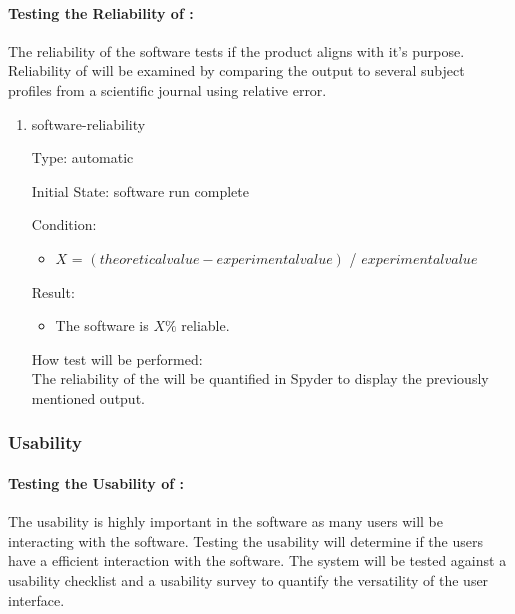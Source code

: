 \documentclass[12pt, titlepage]{article}
\begin{document}
\paragraph{Testing the Reliability of \progname{}:}
The reliability of the software tests if the product aligns with it's purpose. 
Reliability of \progname{} will be examined by comparing the output to several 
subject profiles from a scientific journal using relative error.
\begin{enumerate}

\item{software-reliability\\}

Type: automatic
					
Initial State: \progname{} software run complete
					
Condition:
\begin{itemize} %
\item $X$ = $(theoretical value - experimental value)$ / $experimental value$
\end{itemize}

Result: 
\begin{itemize}
\item The software is $X\%$ reliable.
\end{itemize}
				
					
How test will be performed: \\
The reliability of the \progname{} will be quantified in Spyder to display the 
previously mentioned output. \\

\end{enumerate}

\subsubsection{Usability}

\paragraph{Testing the Usability of \progname{}:}

The usability is highly important in the \progname{} software as many users 
will be interacting with the software. Testing the usability will determine if 
the users have a efficient interaction with the software. The system will be 
tested against a usability checklist and a usability survey to quantify the 
versatility of the user interface.
\end{document}
